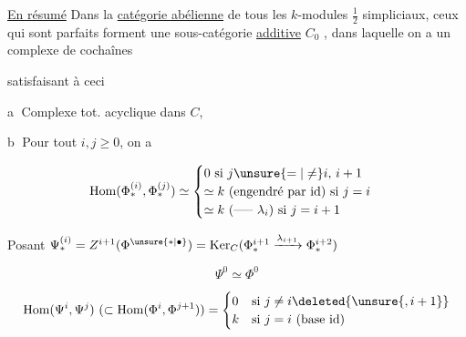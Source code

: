 
\uline{En résumé} Dans la \uline{catégorie abélienne}  de tous les $k$-modules $\frac12$ simpliciaux, ceux qui sont parfaits forment une sous-catégorie \uline{additive} $C_0$ , dans laquelle on a un complexe de cochaînes


satisfaisant à ceci \par\textcircled{a} Complexe tot. acyclique dans $C$, 

\textcircled{b} Pour tout $i,j\geq0$, on a

\[\operatorname{Hom}(\Phi_{\ast}^{(i)},\Phi_{\ast}^{(j)})\simeq
\begin{cases}0\ \text{si }j\unsure{=|\ne}i,\,i+1\\
\simeq k\ (\text{engendré par id})\ \text{si }j=i\\
\simeq k\ (\text{----- }\lambda_i)\ \text{si }j=i+1\end{cases}\]

Posant $\Psi_{\ast}^{(i)}=Z^{i+1}(\Phi^{\unsure{\ast|\bullet}})=\operatorname{Ker}_{C}(\Phi_{\ast}^{i+1}\xrightarrow{\lambda_{i+1}}\Phi_{\ast}^{i+2})$ 

\[ \Psi^0\simeq\Phi^0 \]


\[\operatorname{Hom}(\Psi^i,\Psi^j)\ (\subset\operatorname{Hom}(\Phi^i,\Phi^{j+1}))=
\begin{cases}0&\text{si }j\ne i\deleted{\unsure{,i+1}}\\k&\text{si }j=i\ (\text{base id})\end{cases}\]


